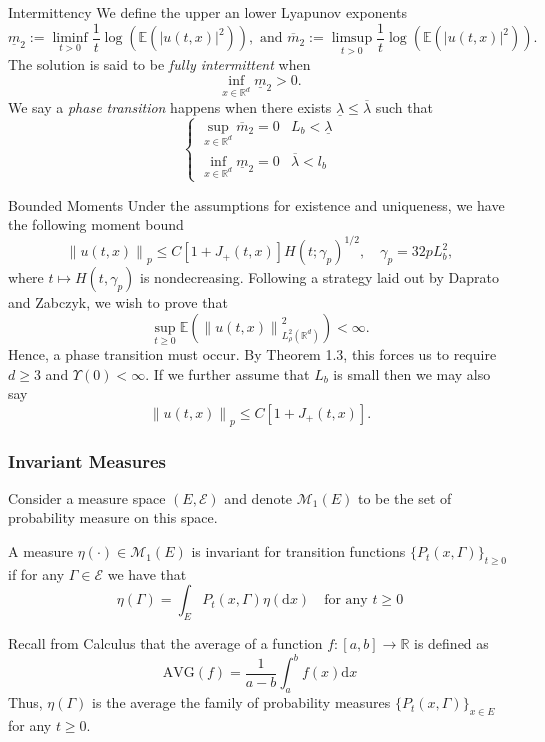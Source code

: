 \documentclass{beamer}%
\numberwithin{equation}{section}
\newcommand{\R}{\mathbb{R}}
\newcommand{\Norm}[1]{\left\|  #1   \right\|}
\newcommand{\ud}{\ensuremath{\mathrm{d} }}
\begin{document}
\begin{frame}{Intermittency}
	We define the upper an lower Lyapunov exponents 
	\[
	\underline{m}_2 := \liminf_{t>0} \frac{1}{t} \log\left(\mathbb{E}(|u(t,x)|^2) \right), \text{ and } \overline{m}_2 := \limsup_{t>0} \frac{1}{t} \log\left(\mathbb{E}(|u(t,x)|^2)\right).
	\]
	The solution is said to be {\it fully intermittent} when 
	\[
	\inf_{x\in\R^d} \underline{m}_2 > 0.
	\]
	We say a {\it phase transition} happens when there exists $\underline{\lambda} \le \overline\lambda$ such that 
	\[
	\begin{cases}
	\sup_{x \in \R^d} \overline{m}_2 = 0 & L_b < \underline{\lambda} \\
	\inf_{x \in \R^d} \underline{m}_2 = 0 &  \overline{\lambda} < l_b  
	\end{cases}
	\]
\end{frame}

%	

\begin{frame}{Bounded Moments}
	Under the assumptions for existence and uniqueness, we have the following moment bound
	\[
	\Norm{u(t,x)}_p \le C[1 + J_+(t,x)]H(t;\gamma_p)^{1/2}, \quad \gamma_p = 32pL_b^2,
	\]
	where $t\mapsto H(t,\gamma_p)$ is nondecreasing. Following a strategy laid out by Daprato and Zabczyk, we wish to prove that 
	\[
	\sup_{t \ge 0} \mathbb{E}\left( \Norm{u(t,x)}_{L^2_{\rho}(\R^d)}^2 \right) < \infty .
	\]
	Hence, a phase transition must occur. By Theorem 1.3, this forces us to require $d \ge 3$ and $\Upsilon(0) < \infty$. If we further assume that $L_b$ is small then we may also say 
	\[
	\Norm{u(t,x)}_p \le C[1 + J_+(t,x)].
	\]
	
\end{frame}

\begin{frame}[t]
	\frametitle{Invariant Measures}
Consider a measure space $(E, \mathscr{E})$ and denote $\mathcal{M}_1(E)$ to be the set of probability measure on this space.
	\begin{definition} 
		A measure $\eta(\cdot) \in \mathcal M_1(E)$ is invariant for transition functions $\{P_t(x,\Gamma)\} _{t\ge 0}$ if for any $\Gamma \in \mathscr E$ we have that $$ \eta(\Gamma) = \int_E P_t(x,\Gamma)\eta(\ud x) \quad \text{for any $t\ge 0$} $$
	\end{definition}
	
	Recall from Calculus that the average of a function $f:[a,b] \to \R$ is defined as
	$$ \text{AVG}(f) = \dfrac{1}{a-b}\int_a^b f(x) \ud x$$
	Thus,  $\eta(\Gamma)$ is the average the family of probability measures $\{P_t(x,\Gamma)\}_{x \in E}$ for any $t \ge 0$.
	
\end{frame}
\end{document}

